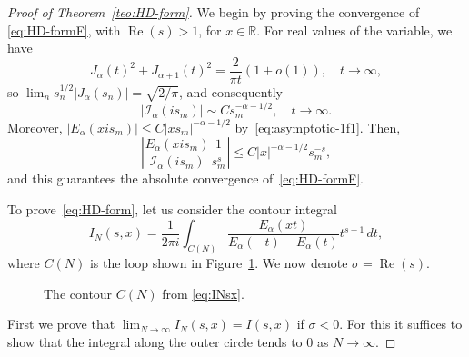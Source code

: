 \documentclass[a4paper]{amsart}
\newcommand{\R}{\mathbb{R}}
\newcommand{\I}{\mathcal{I}}
\newcommand{\Ea}{E_{\alpha}}
\renewcommand{\Re}{\operatorname{Re}}
\theoremstyle{plain}
\theoremstyle{definition}
\theoremstyle{remark}
\numberwithin{equation}{section}
\begin{document}
\begin{proof}[Proof of Theorem~\ref{teo:HD-form}]
We begin by proving the convergence of \eqref{eq:HD-formF}, with $\Re(s)>1$, for $x \in \R$.
For real values of the variable, we have
\[
J_{\alpha}(t)^2 + J_{\alpha+1}(t)^2 = \frac{2}{\pi t}(1+o(1)), \quad t \to \infty,
\]
so $\lim_n s_n^{1/2} |J_\alpha(s_n)| = \sqrt{2/\pi}$, and consequently
\[
  |\I_{\alpha}(is_m)| \sim C s_m^{-\alpha-1/2}, \quad t \to \infty.
\]
Moreover, $|\Ea(xis_m)| \le C|xs_m|^{-\alpha-1/2}$ by~\eqref{eq:asymptotic-1f1}. Then,
\[
  \left| \frac{\Ea(xi s_m)}{\I_{\alpha}(i s_m)} \frac{1}{s_m^s} \right|
  \le C |x|^{-\alpha-1/2} s_m^{-s},
\]
and this guarantees the absolute convergence of~\eqref{eq:HD-formF}.

To prove~\eqref{eq:HD-form}, let us consider the contour integral
\begin{equation}
\label{eq:INsx}
    I_N(s,x) = \frac{1}{2\pi i}\int_{C(N)}\frac{\Ea(xt)}{\Ea(-t)-\Ea(t)} t^{s-1}\,dt,
\end{equation}
where $C(N)$ is the loop shown in Figure~\ref{fig:contour-cN}.
We now denote $\sigma = \Re(s)$.

\begin{figure}[ht]
\centering
{}
\caption{The contour $C(N)$ from \eqref{eq:INsx}.}
\label{fig:contour-cN}
\end{figure}

First we prove that $\lim_{N\to \infty} I_N(s,x) = I(s,x)$ if $\sigma < 0$. For this it suffices to show that the integral along the outer circle tends to $0$ as $N\to \infty$.


\end{proof}
\end{document}
